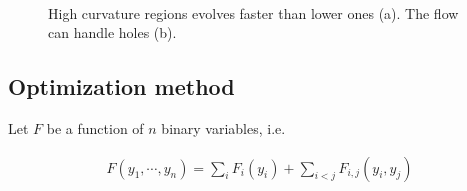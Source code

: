 \documentclass[runningheads]{llncs}
\begin{document}
\begin{figure}[!ht]
\center
{}\\%
\label{fig:mx-speed-variation-hole-filling}
\caption{High curvature regions evolves faster than lower ones (a). The flow can handle holes (b). }
\end{figure}


\subsection{Optimization method}

Let $F$ be a function of $n$ binary variables, i.e.

\begin{align*}
F(y_1,\cdots, y_n) = \sum_{i}{F_i(y_i)} + \sum_{i < j}{F_{i,j}(y_i,y_j)}
\end{align*}
\end{document}
